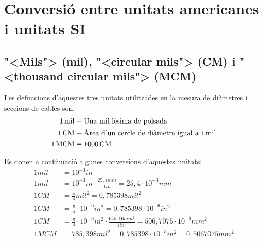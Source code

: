 \section{Conversi\'{o} entre unitats americanes i unitats SI}

\subsection{{"<}Mils{">} (mil), {"<}circular mils{">} (CM) i {"<}thousand circular mils{">} (MCM)}
  

  Les definicions d'aquestes tres unitats utilitzades en la mesura de di\`{a}metres i seccions de cables son:
\begin{align}
  1\unit{mil} &\equiv \text{Una mi{\l.l}\`{e}sima de polsada} \\
  1\unit{CM} &\equiv  \text{\`{A}rea d'un cercle de di\`{a}metre igual a 1\unit{mil}} \\
  1\unit{MCM} &\equiv 1000\unit{CM}
\end{align}

  Es donen a continuaci\'{o} algunes conversions d'aquestes unitats:
\begin{align}
   1\unit{mil} &= 10^{-3}\unit{in}  \\
  1\unit{mil} &= 10^{-3}\unit{in} \cdot \frac{25{,}4\unit{mm}}{1\unit{in}} = 25{,}4 \cdot 10^{-3}\unit{mm}  \\
  1\unit{CM} &= \frac{\pi}{4}\unit{mil^2} = 0{,}785398\unit{mil^2}   \\
   1\unit{CM} &= \frac{\pi}{4}\cdot 10^{-6}\unit{in^2} = 0{,}785398\cdot 10^{-6}\unit{in^2} \\
   1\unit{CM} &= \frac{\pi}{4} \cdot 10^{-6}\unit{in^2} \cdot \frac{645{,}16\unit{mm^2}}{1\unit{in^2}} = 506{,}7075\cdot 10^{-6}\unit{mm^2}
   \\[1ex]
   1\unit{MCM} &= 785{,}398\unit{mil^2}  = 0{,}785398\cdot 10^{-3}\unit{in^2} = 0{,}5067075\unit{mm^2}
\end{align}

